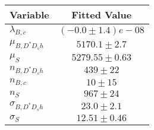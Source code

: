 \begin{tabular}[t]{lc}
\hline
Variable &Fitted Value\\
\hline\hline
$\lambda_{B,c}$&$(-0.0\pm1.4)e-08$\\
\hline
$\mu_{B, D^* D_s h}$&$5170.1\pm2.7$\\
\hline
$\mu_S$&$5279.55\pm0.63$\\
\hline
$n_{B, D^* D_s h}$&$439\pm22$\\
\hline
$n_{B,c}$&$10\pm15$\\
\hline
$n_S$&$967\pm24$\\
\hline
$\sigma_{B, D^* D_s h}$&$23.0\pm2.1$\\
\hline
$\sigma_S$&$12.51\pm0.46$\\
\hline
\end{tabular}